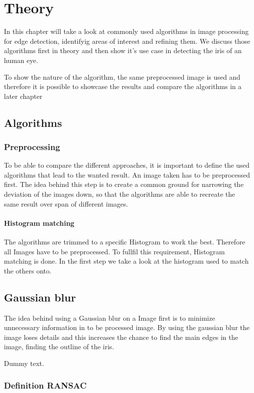 \chapter{Theory}

In this chapter will take a look at commonly used algorithms in image processing for edge detection, identifyig areas of interest and refining them. 
We discuss those algorithms first in theory and then show it's use case in detecting the iris of an human eye. 

To show the nature of the algorithm, the same preprocessed image is used and therefore it is possible to showcase the results and compare the algorithms in a later chapter
\section{Algorithms}




\subsection{Preprocessing}
To be able to compare the different approaches, it is important to define the used algorithms that lead to the wanted result.
An image taken has to be preprocessed first. The idea behind this step is to create a common ground for narrowing the deviation of the images down, so that the algorithms are 
able to recreate the same result over span of different images.

\subsubsection{Histogram matching}
The algorithms are trimmed to a specific Histogram to work the best. Therefore all Images have to be preprocessed. To fullfil this requirement, Histogram matching is done. In the first step
we take a look at the histogram used to match the others onto. 

\section{Gaussian blur}
The idea behind using a Gaussian blur on a Image first is to minimize unnecessary information in to be processed image. By using the gaussian blur the image loses details and 
this increases the chance to find the main edges in the image, finding the outline of the iris. 


Dummy text.

\subsection{Definition RANSAC}

